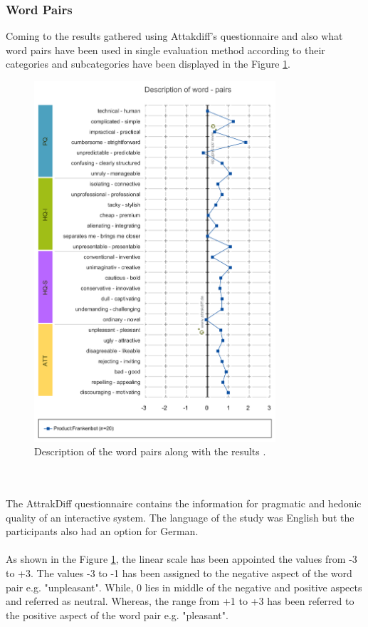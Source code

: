 \subsubsection*{Word Pairs}
Coming to the results gathered using Attakdiff's questionnaire and also what word pairs have been used in single evaluation method according to their categories and subcategories have been displayed in the Figure \ref{fig:descofWordPair}.

\begin{figure}[!h]
    \centering
    \includegraphics[width=0.8\textwidth]{img/Description_of_word_pairs.png}
    \caption{Description of the word pairs along with the results \cite{attrakdiff}.}
    \label{fig:descofWordPair}
\end{figure}
\\~\\
The AttrakDiff questionnaire contains the information for pragmatic and hedonic quality of an interactive system. The language of the study was English but the participants also had an option for German.
\\~\\
As shown in the Figure \ref{fig:descofWordPair}, the linear scale has been appointed the values from -3 to +3. The values -3 to -1 has been assigned to the negative aspect of the word pair e.g. "unpleasant". While, 0 lies in middle of the negative and positive aspects and referred as neutral. Whereas, the range from +1 to +3 has been referred to the positive aspect of the word pair e.g. "pleasant".
